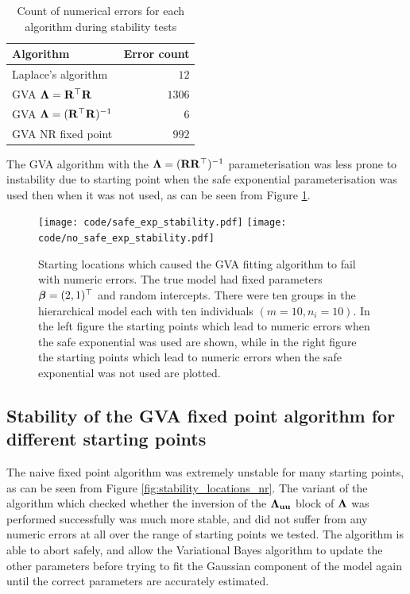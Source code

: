 \begin{table}
	\begin{tabular}{|l|r|}
		\hline
		Algorithm                            & Error count \\
		\hline
		Laplace's algorithm                  & $12$          \\
		GVA ${\boldsymbol \Lambda} = {\bf R}^\top {\bf R}$        & $1306$       \\
		GVA ${\boldsymbol \Lambda} = ({\bf R}^\top {\bf R})^{-1}$ & $6$           \\
		GVA NR fixed point                   & $992$         \\
		\hline
	\end{tabular}
	\caption{Count of numerical errors for each algorithm during stability tests}
	\label{tab:stability_results}
\end{table}

The GVA algorithm with the ${\boldsymbol \Lambda} = ({\bf R} {\bf R}^\top)^{-1}$ parameterisation was less prone to
instability due to starting point when the safe exponential parameterisation was used then when it was
not used, as can be seen from Figure \ref{fig:stability_locations_gva}. %
		
\begin{figure}[h]
	\texttt{[image: code/safe\_exp\_stability.pdf]}
	\texttt{[image: code/no\_safe\_exp\_stability.pdf]}
	\label{fig:stability_locations_gva}
	\caption{Starting locations which caused the GVA fitting algorithm to fail with numeric errors. The true model had fixed parameters ${\boldsymbol \beta} = (2, 1)^\top$ and random intercepts. There were ten groups in the hierarchical model each	with ten individuals $(m=10, n_i=10)$. In the left figure the starting points which lead to numeric errors when the safe exponential was used are shown, while in the right figure the starting points which lead to numeric errors when the safe exponential was not used are plotted.}
\end{figure}

\subsection{Stability of the GVA fixed point algorithm for different starting points}
The naive fixed point algorithm was extremely unstable for many starting points, as can be seen from
Figure \ref{fig:stability_locations_nr}. The variant of the algorithm which checked whether the
inversion of the ${\boldsymbol \Lambda}_{{\bf u} {\bf u}}$ block of ${\boldsymbol \Lambda}$ was performed successfully was much more
stable, and did not suffer from any numeric errors at all over the range of starting points we tested.
The algorithm is able to abort safely, and allow the Variational Bayes algorithm to update the other
parameters before trying to fit the Gaussian component of the model again until the correct parameters
are accurately estimated.

